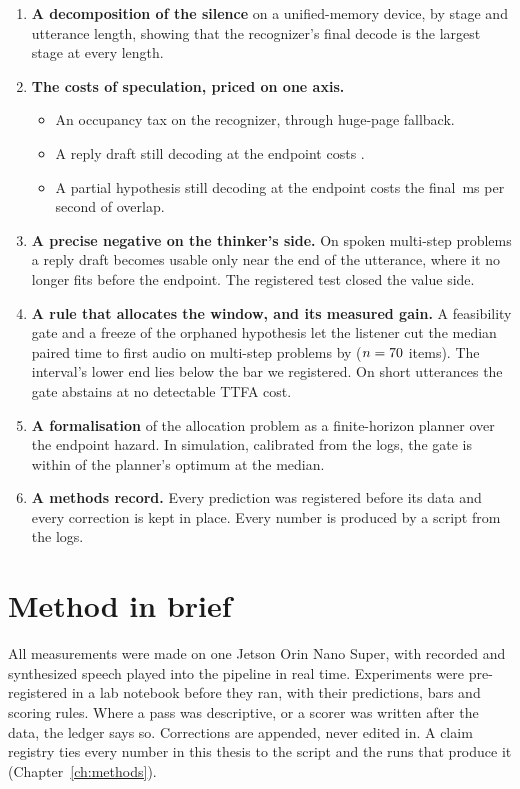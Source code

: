 \begin{enumerate}
\item \textbf{A decomposition of the silence} on a unified-memory device, by
  stage and utterance length, showing that the recognizer's final decode is
  the largest stage at every length.
\item \textbf{The costs of speculation, priced on one axis.}
  \begin{itemize}
  \item An occupancy tax on the recognizer, through huge-page fallback.
  \item A reply draft still decoding at the endpoint costs \ThinkerOverlap{}.
  \item A partial hypothesis still decoding at the endpoint costs the final
    \ListenerC\,ms per second of overlap.
  \end{itemize}
\item \textbf{A precise negative on the thinker's side.} On spoken multi-step
  problems a reply draft becomes usable only near the end of the utterance,
  where it no longer fits before the endpoint. The registered test closed the
  value side.
\item \textbf{A rule that allocates the window, and its measured gain.} A
  feasibility gate and a freeze of the orphaned hypothesis let the listener cut
  the median paired time to first audio on multi-step problems by \PthreeRed{}
  ($n=70$ items). The interval's lower end lies below the bar we
  registered. On short utterances the gate abstains at no detectable TTFA
  cost.
\item \textbf{A formalisation} of the allocation problem as a finite-horizon
  planner over the endpoint hazard. In simulation, calibrated from the logs,
  the gate is within \PlannerDP{} of the planner's optimum at the median.
\item \textbf{A methods record.} Every prediction was registered before its
  data and every correction is kept in place. Every number is produced by a
  script from the logs.
\end{enumerate}

\section{Method in brief}

All measurements were made on one Jetson Orin Nano Super, with recorded and
synthesized speech played into the pipeline in real time. Experiments were
pre-registered in a lab notebook before they ran, with their predictions,
bars and scoring rules. Where a pass was descriptive, or a scorer was written
after the data, the ledger says so. Corrections are appended, never edited in. A
claim registry ties every number in this thesis to the script and the runs
that produce it (Chapter~\ref{ch:methods}).

